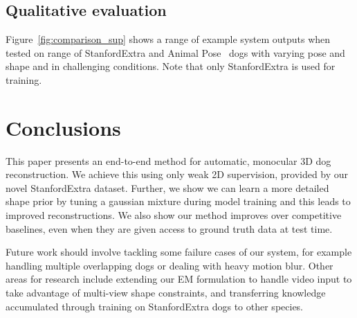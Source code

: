 % 
% 

\subsection{Qualitative evaluation}

Figure~\ref{fig:comparison_sup} shows a range of example system outputs when tested on range of StanfordExtra and Animal Pose~\cite{animalpose} dogs with varying pose and shape and in challenging conditions. Note that only StanfordExtra is used for training.


% 

% 

% 

\section{Conclusions}
This paper presents an end-to-end method for automatic, monocular 3D dog reconstruction. We achieve this using only weak 2D supervision, provided by our novel StanfordExtra dataset. Further, we show we can learn a more detailed shape prior by tuning a gaussian mixture during model training and this leads to improved reconstructions. We also show our method improves over competitive baselines, even when they are given access to ground truth data at test time.

Future work should involve tackling some failure cases of our system, for example handling multiple overlapping dogs or dealing with heavy motion blur. Other areas for research include extending our EM formulation to handle video input to take advantage of multi-view shape constraints, and transferring knowledge accumulated through training on StanfordExtra dogs to other species.

